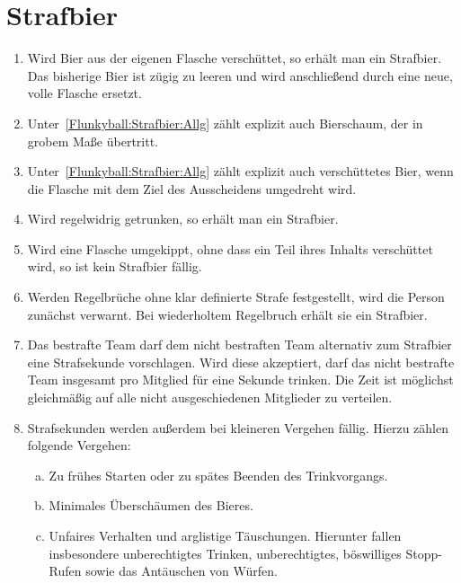 \section{Strafbier}
\begin{enumerate}[label={(\arabic*)}]
    \item\label{Flunkyball:Strafbier:Allg}
    Wird Bier aus der eigenen Flasche verschüttet, so erhält man ein Strafbier.
    Das bisherige Bier ist zügig zu leeren und wird anschließend durch eine neue, volle Flasche ersetzt.

    \item
    Unter~\ref{Flunkyball:Strafbier:Allg} zählt explizit auch Bierschaum, der in grobem Maße übertritt.

    \item
    Unter~\ref{Flunkyball:Strafbier:Allg} zählt explizit auch verschüttetes Bier, wenn die Flasche mit dem Ziel des Ausscheidens umgedreht wird.

    \item
    Wird regelwidrig getrunken, so erhält man ein Strafbier.

    \item
    Wird eine Flasche umgekippt, ohne dass ein Teil ihres Inhalts verschüttet wird, so ist kein Strafbier fällig.

    \item
    Werden Regelbrüche ohne klar definierte Strafe festgestellt, wird die Person zunächst verwarnt.
    Bei wiederholtem Regelbruch erhält sie ein Strafbier.

    \item
    Das bestrafte Team darf dem nicht bestraften Team alternativ zum Strafbier eine Strafsekunde vorschlagen.
    Wird diese akzeptiert, darf das nicht bestrafte Team insgesamt pro Mitglied für eine Sekunde trinken.
    Die Zeit ist möglichst gleichmäßig auf alle nicht ausgeschiedenen Mitglieder zu verteilen.

    \item
    Strafsekunden werden außerdem bei kleineren Vergehen fällig.
    Hierzu zählen folgende Vergehen:
    \begin{enumerate}[a.]
        \item
        Zu frühes Starten oder zu spätes Beenden des Trinkvorgangs.
        \item
        Minimales Überschäumen des Bieres.
        \item
        Unfaires Verhalten und arglistige Täuschungen.
        Hierunter fallen insbesondere unberechtigtes Trinken, unberechtigtes, böswilliges \glqq{}Stopp\grqq{}-Rufen sowie das Antäuschen von Würfen.
    \end{enumerate}
\end{enumerate}
